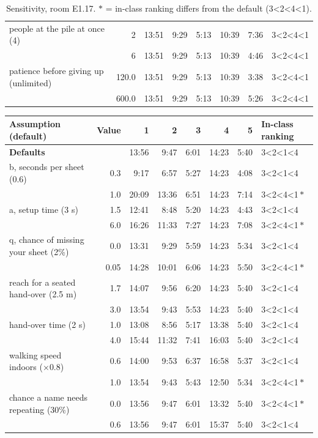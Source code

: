 {\begin{table}[htbp]
\begin{tabular}{lrrrrrrl}
people at the pile at once (4) & 2 & 13:51 & 9:29 & 5:13 & 10:39 & 7:36 & 3<2<4<1 \\
 & 6 & 13:51 & 9:29 & 5:13 & 10:39 & 4:46 & 3<2<4<1 \\
patience before giving up (unlimited) & 120.0 & 13:51 & 9:29 & 5:13 & 10:39 & 3:38 & 3<2<4<1 \\
 & 600.0 & 13:51 & 9:29 & 5:13 & 10:39 & 5:26 & 3<2<4<1 \\
\bottomrule
\end{tabular}
\caption{Sensitivity, room E1.17. $\ast$ = in-class ranking differs from the default (3<2<4<1).}
\end{table}
\begin{table}[htbp]\centering\footnotesize
\begin{tabular}{lrrrrrrl}
\toprule
Assumption (default) & Value & 1 & 2 & 3 & 4 & 5 & In-class ranking \\
\midrule
\textbf{Defaults} &  & 13:56 & 9:47 & 6:01 & 14:23 & 5:40 & 3<2<1<4 \\
b, seconds per sheet (0.6) & 0.3 & 9:17 & 6:57 & 5:27 & 14:23 & 4:08 & 3<2<1<4 \\
 & 1.0 & 20:09 & 13:36 & 6:51 & 14:23 & 7:14 & 3<2<4<1\,$\ast$ \\
a, setup time (3 s) & 1.5 & 12:41 & 8:48 & 5:20 & 14:23 & 4:43 & 3<2<1<4 \\
 & 6.0 & 16:26 & 11:33 & 7:27 & 14:23 & 7:08 & 3<2<4<1\,$\ast$ \\
q, chance of missing your sheet (2\%) & 0.0 & 13:31 & 9:29 & 5:59 & 14:23 & 5:34 & 3<2<1<4 \\
 & 0.05 & 14:28 & 10:01 & 6:06 & 14:23 & 5:50 & 3<2<4<1\,$\ast$ \\
reach for a seated hand-over (2.5 m) & 1.7 & 14:07 & 9:56 & 6:20 & 14:23 & 5:40 & 3<2<1<4 \\
 & 3.0 & 13:54 & 9:43 & 5:53 & 14:23 & 5:40 & 3<2<1<4 \\
hand-over time (2 s) & 1.0 & 13:08 & 8:56 & 5:17 & 13:38 & 5:40 & 3<2<1<4 \\
 & 4.0 & 15:44 & 11:32 & 7:41 & 16:03 & 5:40 & 3<2<1<4 \\
walking speed indoors ($\times$0.8) & 0.6 & 14:00 & 9:53 & 6:37 & 16:58 & 5:37 & 3<2<1<4 \\
 & 1.0 & 13:54 & 9:43 & 5:43 & 12:50 & 5:34 & 3<2<4<1\,$\ast$ \\
chance a name needs repeating (30\%) & 0.0 & 13:56 & 9:47 & 6:01 & 13:32 & 5:40 & 3<2<4<1\,$\ast$ \\
 & 0.6 & 13:56 & 9:47 & 6:01 & 15:37 & 5:40 & 3<2<1<4 \\

\end{tabular}
\end{table}}

